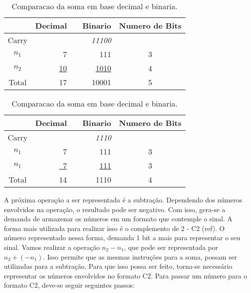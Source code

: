 \documentclass[12pt]{article}
\begin{document}
\begin{table}[ht]
	\centering
    \caption{Comparacao da soma em base decimal e binaria.}
    \begin{tabular}{crrrc}
    \hline
    	  & Decimal & & Binario & Numero de Bits \\
    \hline      
    Carry & 	& & \textit{11100} & \\
    $n_1$ & 7   & & 111 & 3 \\
    $n_2$ & \underline{10}	& & \underline{1010} & 4 \\
    Total & 17	& & 10001 & 5 \\
    \hline
	\end{tabular}
    \label{tab:01}
\end{table}

\begin{table}[ht]
	\centering
    \caption{Comparacao da soma em base decimal e binaria.}
    \begin{tabular}{crrrc}
    \hline
    	  & Decimal & & Binario & Numero de Bits \\
    \hline      
    Carry & 	& & \textit{1110} & \\
    $n_1$ & 7   & & 111 & 3 \\
    $n_1$ & \underline{~7}	& & \underline{111} & 3 \\
    Total & 14	& & 1110 & 4 \\
    \hline
	\end{tabular}
    \label{tab:02}
\end{table}

A próxima operação a ser representada é a subtração. Dependendo dos números
envolvidos na operação, o resultado pode ser negativo. Com isso, gera-se a
demanda de armazenar os números em um formato que contemple o sinal. A forma
mais utilizada para realizar isso é o complemento de 2 - C2 (ref). O número
representado nessa forma, demanda 1 bit a mais para representar o seu sinal.
Vamos realizar a operação $n_2 - n_1$, que pode ser representada por $n_2 +
(-n_1)$. Isso permite que as mesmas instruções para a soma, possam ser
utilizadas para a subtração. Para que isso possa ser feito, torna-se necessário
representar os números envolvidos no formato C2. Para passar um número para o
formato C2, deve-se seguir seguintes passos:
\end{document}
